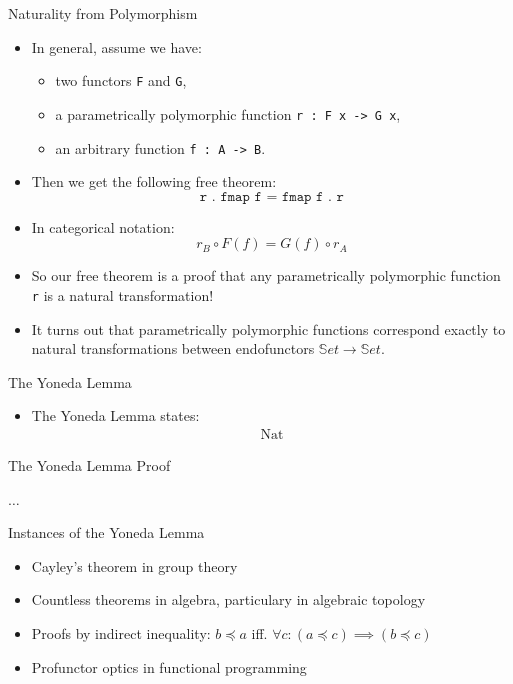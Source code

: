 \documentclass[aspectratio=169]{beamer} %
\newcommand{\bS}{\mathbb{S}}
\begin{document}
{\begin{frame}{Naturality from Polymorphism}
\begin{itemize}
      \item In general, assume we have:
      \begin{itemize}
        \item two functors \texttt{F} and \texttt{G},
        \item a parametrically polymorphic function \texttt{r : F x -> G x},
        \item an arbitrary function \texttt{f : A -> B}.
      \end{itemize}
      \pause\item Then we get the following free theorem:
      \begin{equation*}
       \texttt{r . fmap f = fmap f . r}
      \end{equation*}
      \vspace{-18pt}
      \pause\item In categorical notation:
      \begin{equation*}
        r_B \circ F(f) = G(f) \circ r_A
      \end{equation*}
      \vspace{-18pt}
      \pause\item So our free theorem is a proof that any parametrically polymorphic function \texttt{r} is a natural transformation!
      \pause\item It turns out that parametrically polymorphic functions correspond exactly to natural transformations between endofunctors $\bS et \to \bS et$.
    \end{itemize}
\end{frame}
\begin{frame}{The Yoneda Lemma}
\begin{itemize}
 \item The Yoneda Lemma states:
 \begin{align*}
  \text{Nat}
 \end{align*}

\end{itemize}

\end{frame}
\begin{frame}{The Yoneda Lemma}
Proof
\end{frame}
\begin{frame}
 $\hdots$
\end{frame}
\begin{frame}{Instances of the Yoneda Lemma}
\begin{itemize}
 \item Cayley's theorem in group theory
 \item Countless theorems in algebra, particulary in algebraic topology
 \item Proofs by indirect inequality: $b \preceq a$ iff. $\forall c : (a \preceq c) \implies (b \preceq c)$
 \item Profunctor optics in functional programming
\end{itemize}


\end{frame}}
\end{document}
